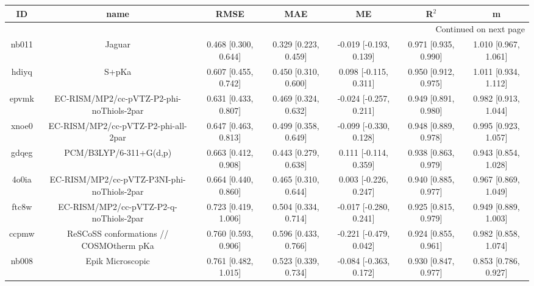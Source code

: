 \documentclass{article}
\begin{document}
\begin{center}
\begin{longtable}{|ccccccc|}
\toprule
    ID &                                               name &                  RMSE &                   MAE &                       ME &                 R$^2$ &                      m \\
\midrule
\endhead
\midrule
\multicolumn{7}{r}{{Continued on next page}} \\
\midrule
\endfoot

\bottomrule
\endlastfoot
 nb011 &                                             Jaguar &  0.468 [0.300, 0.644] &  0.329 [0.223, 0.459] &   -0.019 [-0.193, 0.139] &  0.971 [0.935, 0.990] &   1.010 [0.967, 1.061] \\
 hdiyq &                                              S+pKa &  0.607 [0.455, 0.742] &  0.450 [0.310, 0.600] &    0.098 [-0.115, 0.311] &  0.950 [0.912, 0.975] &   1.011 [0.934, 1.112] \\
 epvmk &           EC-RISM/MP2/cc-pVTZ-P2-phi-noThiols-2par &  0.631 [0.433, 0.807] &  0.469 [0.324, 0.632] &   -0.024 [-0.257, 0.211] &  0.949 [0.891, 0.980] &   0.982 [0.913, 1.044] \\
 xnoe0 &                EC-RISM/MP2/cc-pVTZ-P2-phi-all-2par &  0.647 [0.463, 0.813] &  0.499 [0.358, 0.649] &   -0.099 [-0.330, 0.128] &  0.948 [0.889, 0.978] &   0.995 [0.923, 1.057] \\
 gdqeg &                             PCM/B3LYP/6-311+G(d,p) &  0.663 [0.412, 0.908] &  0.443 [0.279, 0.638] &    0.111 [-0.114, 0.359] &  0.938 [0.863, 0.979] &   0.943 [0.854, 1.028] \\
 4o0ia &         EC-RISM/MP2/cc-pVTZ-P3NI-phi-noThiols-2par &  0.664 [0.440, 0.860] &  0.465 [0.310, 0.644] &    0.003 [-0.226, 0.247] &  0.940 [0.885, 0.977] &   0.967 [0.869, 1.049] \\
 ftc8w &             EC-RISM/MP2/cc-pVTZ-P2-q-noThiols-2par &  0.723 [0.419, 1.006] &  0.504 [0.334, 0.714] &   -0.017 [-0.280, 0.241] &  0.925 [0.815, 0.979] &   0.949 [0.889, 1.003] \\
 ccpmw &            ReSCoSS conformations // COSMOtherm pKa &  0.760 [0.593, 0.906] &  0.596 [0.433, 0.766] &   -0.221 [-0.479, 0.042] &  0.924 [0.855, 0.961] &   0.982 [0.858, 1.074] \\
 nb008 &                                   Epik Microscopic &  0.761 [0.482, 1.015] &  0.523 [0.339, 0.734] &   -0.084 [-0.363, 0.172] &  0.930 [0.847, 0.977] &   0.853 [0.786, 0.927] \\

\end{longtable}
\end{center}
\end{document}
